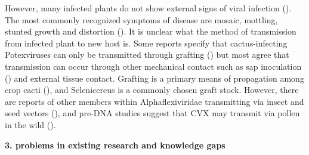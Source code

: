\documentclass{article}
\begin{document}
However, many infected plants do not show external signs of viral infection (\cite{liou_complete_2004, bos_symptoms_nodate}). 
The most commonly recognized symptoms of disease are mosaic, mottling, stunted growth and distortion (\cite{maliarenko_cactus_2013, peng_molecular_2016, attathom_occurrence_1978}). 
It is unclear what the method of transmission from infected plant to new host is. 
Some reports specify that cactus-infecting Potexviruses can only be transmitted through grafting (\cite{duarte_potexvirus_2008, martelli_family_2007}) but most agree that transmission can occur through other mechanical contact such as sap inoculation (\cite{liou_complete_2004, maliarenko_cactus_2013, park_detection_2018}) and external tissue contact. 
Grafting is a primary means of propagation among crop cacti (\cite{park_detection_2018}), and Selenicereus is a commonly chosen graft stock. 
However, there are reports of other members within Alphaflexiviridae transmitting via insect and seed vectors (\cite{martelli_family_2007}), and pre-DNA studies suggest that CVX may transmit via pollen in the wild (\cite{attathom_occurrence_1978}).

    
\textbf{3. problems in existing research and knowledge gaps}

\end{document}
